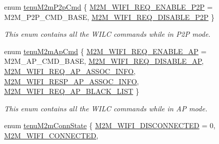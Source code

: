 \begin{DoxyCompactItemize}
\item 
enum \hyperlink{group__WlanEnums_gac07a15ce7dd9a5508a5cff22ce91f65c}{tenu\+M2m\+P2p\+Cmd} \{ \hyperlink{group__WlanEnums_ggac07a15ce7dd9a5508a5cff22ce91f65ca90a1df2d26da91a705178e5a650292c2}{M2\+M\+\_\+\+W\+I\+F\+I\+\_\+\+R\+E\+Q\+\_\+\+E\+N\+A\+B\+L\+E\+\_\+\+P2P} = M2\+M\+\_\+\+P2\+P\+\_\+\+C\+M\+D\+\_\+\+B\+A\+SE, 
\hyperlink{group__WlanEnums_ggac07a15ce7dd9a5508a5cff22ce91f65caec58cbf2b3cca544d7e7015b42249f2f}{M2\+M\+\_\+\+W\+I\+F\+I\+\_\+\+R\+E\+Q\+\_\+\+D\+I\+S\+A\+B\+L\+E\+\_\+\+P2P}
 \}\begin{DoxyCompactList}\small\item\em This enum contains all the W\+I\+LC commands while in P2P mode. \end{DoxyCompactList}
\item 
enum \hyperlink{group__WlanEnums_gaa62989ea5e2977b374a04db81c89d524}{tenu\+M2m\+Ap\+Cmd} \{ \newline
\hyperlink{group__WlanEnums_ggaa62989ea5e2977b374a04db81c89d524aea60fb0c4912ce9ead2d776c19b4434f}{M2\+M\+\_\+\+W\+I\+F\+I\+\_\+\+R\+E\+Q\+\_\+\+E\+N\+A\+B\+L\+E\+\_\+\+AP} = M2\+M\+\_\+\+A\+P\+\_\+\+C\+M\+D\+\_\+\+B\+A\+SE, 
\hyperlink{group__WlanEnums_ggaa62989ea5e2977b374a04db81c89d524a472b080df0dcfd0cc31d9299c252ef38}{M2\+M\+\_\+\+W\+I\+F\+I\+\_\+\+R\+E\+Q\+\_\+\+D\+I\+S\+A\+B\+L\+E\+\_\+\+AP}, 
\hyperlink{group__WlanEnums_ggaa62989ea5e2977b374a04db81c89d524a29641c61a3ed08222ca65a14bf2c2f24}{M2\+M\+\_\+\+W\+I\+F\+I\+\_\+\+R\+E\+Q\+\_\+\+A\+P\+\_\+\+A\+S\+S\+O\+C\+\_\+\+I\+N\+FO}, 
\hyperlink{group__WlanEnums_ggaa62989ea5e2977b374a04db81c89d524ae44909b7e419ce7c69f64ab8399ea67d}{M2\+M\+\_\+\+W\+I\+F\+I\+\_\+\+R\+E\+S\+P\+\_\+\+A\+P\+\_\+\+A\+S\+S\+O\+C\+\_\+\+I\+N\+FO}, 
\newline
\hyperlink{group__WlanEnums_ggaa62989ea5e2977b374a04db81c89d524adb0a42de9451d51642d7269fea6fce9a}{M2\+M\+\_\+\+W\+I\+F\+I\+\_\+\+R\+E\+Q\+\_\+\+A\+P\+\_\+\+B\+L\+A\+C\+K\+\_\+\+L\+I\+ST}
 \}\begin{DoxyCompactList}\small\item\em This enum contains all the W\+I\+LC commands while in AP mode. \end{DoxyCompactList}
\item 
enum \hyperlink{group__WlanEnums_ga460c311f58f4c40c3d20eec9e99db586}{tenu\+M2m\+Conn\+State} \{ \hyperlink{group__WlanEnums_gga460c311f58f4c40c3d20eec9e99db586a0c24dd073c9dde02e789858e161f7106}{M2\+M\+\_\+\+W\+I\+F\+I\+\_\+\+D\+I\+S\+C\+O\+N\+N\+E\+C\+T\+ED} = 0, 
\hyperlink{group__WlanEnums_gga460c311f58f4c40c3d20eec9e99db586a9196649c19ee10e2168e08a5b4785938}{M2\+M\+\_\+\+W\+I\+F\+I\+\_\+\+C\+O\+N\+N\+E\+C\+T\+ED}, 

\end{DoxyCompactItemize}
